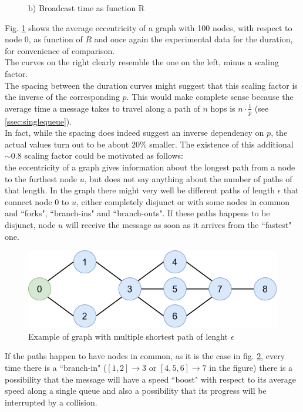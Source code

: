 \begin{figure}[H]
\begin{minipage}{.5\textwidth}
		\begin{center}
            b) Broadcast time as function R
        \end{center}
	\end{minipage}
	\caption{}
    \label{fig:eccentricityDuration}
\end{figure}
\hfill \break
Fig. \ref{fig:eccentricityDuration} shows the average eccentricity of a graph with 100 nodes, with respect to node 0, as function of $R$ and once again the experimental data for the duration, for convenience of comparison.\\
The curves on the right clearly resemble the one on the left, minus a scaling factor.\\
The spacing between the duration curves might suggest that this scaling factor is the inverse of the corresponding $p$. This would make complete sense because the average time a message takes to travel along a path of $n$ hops is $n \cdot \frac{1}{p}$ (see \ref{ssec:singlequeue}).\\
In fact, while the spacing does indeed suggest an inverse dependency on $p$, the actual values turn out to be about 20\% smaller. The existence of this additional $\sim 0.8$ scaling factor could be motivated as follows:\\
the eccentricity of a graph gives information about the longest path from a node to the furthest node $u$, but does not say anything about the number of paths of that length. In the graph there might very well be different paths of length $\epsilon$ that connect node 0 to $u$, either completely disjunct or with some nodes in common and ``forks", ``branch-ins" and ``branch-outs". If these paths happens to be disjunct, node $u$ will receive the message as soon as it arrives from the ``fastest" one. 

\begin{figure}
\includegraphics[width=1\linewidth]{img/branchIn.png} 
\caption{Example of graph with multiple shortest path of lenght $\epsilon$}
\label{fig:branchIn}
\end{figure}

If the paths happen to have nodes in common, as it is the case in fig. \ref{fig:branchIn}, every time there is a ``branch-in" ($[1,2]{\to}3$ or $[4,5,6]{\to}7$ in the figure) there is a possibility that the message will have a speed ``boost" with respect to its average speed along a single queue and also a possibility that its progress will be interrupted by a collision.



